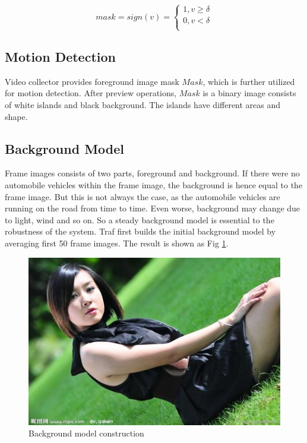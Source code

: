 \documentclass[conference]{IEEEtran}
\begin{document}
	\begin{equation}
	  mask=sign(v)=\left\{
	   \begin{aligned}
	   	1, v \geq \delta \\
	   	0, v < \delta \\
	   \end{aligned}
	   \right.
	   \label{eq:foreMask}
	\end{equation}		
		
	\subsection{Motion Detection}
	Video collector provides foreground image mask $Mask$, which is further utilized for motion detection. After preview operations, $Mask$ is a binary image consists of white islands and black background. The islands have different areas and shape.	%
	\subsection{Background Model}
	Frame images consists of two parts, foreground and background. If there were no automobile vehicles within the frame image, the background is hence equal to the frame image. But this is not always the case, as the automobile vehicles are running on the road from time to time. Even worse, background may change due to light, wind and so on. So a steady background model is essential to the robustness of the system.
	Traf first builds the initial background model by averaging first 50 frame images. The result is shown as Fig \ref{fig:backgroundModel}.
	\begin{figure}[!h]
	\centering
	\includegraphics[width=1\linewidth]{figures/jena.jpg} 
	\caption{Background model construction}
	\label{fig:backgroundModel}
	\end{figure}
	 	
\end{document}
